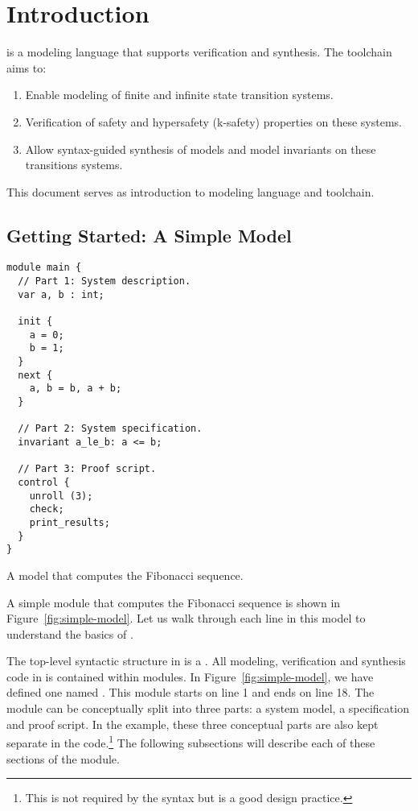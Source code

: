 \chapter{Introduction}

\uclid{} is a modeling language that supports verification and synthesis. The \uclid{} toolchain aims to:
\begin{enumerate}
\item Enable modeling of finite and infinite state transition systems.
\item Verification of safety and hypersafety (k-safety) properties on these systems.
\item Allow syntax-guided synthesis of models and model invariants on these transitions systems.
\end{enumerate}

This document serves as introduction to \uclid{} modeling language and toolchain.

\section{Getting Started: A Simple \uclid{} Model}

\begin{uclidlisting}[htbp]
\begin{lstlisting}[language=uclid,style=uclidstyle]
module main {
  // Part 1: System description.
  var a, b : int;

  init {
    a = 0;
    b = 1;
  }
  next {
    a, b = b, a + b;
  }

  // Part 2: System specification.
  invariant a_le_b: a <= b;

  // Part 3: Proof script.
  control {
    unroll (3);
    check;
    print_results;
  }
}
\end{lstlisting}
\label{fig:simple-model}
\caption{A \uclid{} model that computes the Fibonacci sequence.}
\end{uclidlisting}

A simple \uclid{} module that computes the Fibonacci sequence is shown in Figure~\ref{fig:simple-model}.  Let us walk through each line in this model to understand the basics of \uclid{}.

The top-level syntactic structure in \uclid{} is a . All modeling, verification and synthesis code in \uclid{} is contained within modules. In Figure~\ref{fig:simple-model}, we have defined one  named . This module starts on line 1 and ends on line 18. The module can be conceptually split into three parts: a system model, a specification and proof script. In the example, these three conceptual parts are also kept separate in the code.\footnote{This is not required by the \uclid{} syntax but is a good design practice.} The following subsections will describe each of these sections of the module. 

